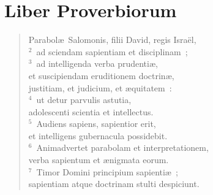 \clearpage
{\centering \section*{Liber Proverbiorum}}\thispagestyle{empty}

\begin{flushleft}\begin{verse}\vspace{-11pt}Parabol\ae\ Salomonis, filii David, regis Isra\"el,\\
${}^{2}$~ad sciendam sapientiam et disciplinam~;\\
${}^{3}$~ad intelligenda verba prudenti\ae ,\\ et suscipiendam eruditionem doctrin\ae ,\\ justitiam, et judicium, et \ae quitatem~:\\
${}^{4}$~ut detur parvulis astutia,\\ adolescenti scientia et intellectus.\\
${}^{5}$~Audiens sapiens, sapientior erit,\\ et intelligens gubernacula possidebit.\\
${}^{6}$~Animadvertet parabolam et interpretationem,\\ verba sapientum et \ae nigmata eorum.\\
${}^{7}$~Timor Domini principium sapienti\ae~;\\ sapientiam atque doctrinam stulti despiciunt.\end{verse}\end{flushleft}


